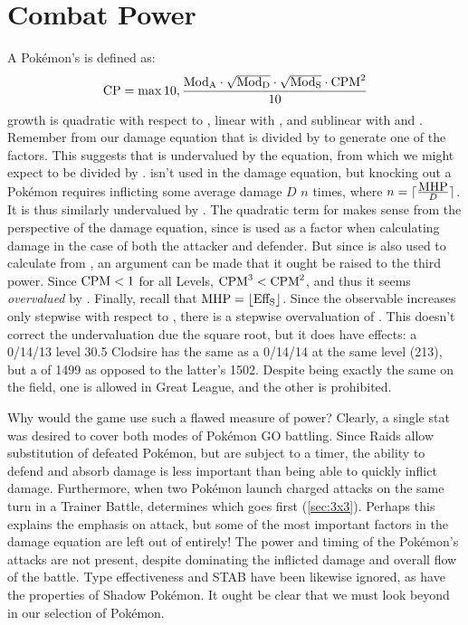 \section{Combat Power\label{sec:cp}}
A Pokémon's \CP{} is defined as:
\[ \mbox{$\mathrm{CP}$} = \max{10, \frac{\mbox{$\mathrm{Mod_{A}}$} \cdot \sqrt{\mbox{$\mathrm{Mod_{D}}$}} \cdot \sqrt{\mbox{$\mathrm{Mod_{S}}$}} \cdot \mbox{$\mathrm{CPM}$}^2}{10}} \]
\CP{} growth is quadratic with respect to \CPM, linear with , and
  sublinear with  and .
Remember from our damage equation that  is divided by 
 to generate one of the factors.
This suggests that  is undervalued by the \CP{} equation, from which
 we might expect  to be divided by .
\MHP{} isn't used in the damage equation, but knocking out a Pokémon
 requires inflicting some average damage $D$ $n$ times,
 where $n = \lceil\frac{\mbox{$\mathrm{MHP}$}}{D}\rceil$.
It is thus similarly undervalued by \CP\@.
The quadratic term for \CPM{} makes sense from the perspective of the damage
 equation, since \CPM{} is used as a factor when calculating damage in the
 case of both the attacker and defender.
But since \CPM{} is also used to calculate \MHP{} from , an argument
 can be made that it ought be raised to the third power.
Since $\mbox{$\mathrm{CPM}$} < 1$ for all Levels, $\mbox{$\mathrm{CPM}$}^3 < \mbox{$\mathrm{CPM}$}^2$, and thus it seems \textit{overvalued} by \CP\@.
Finally, recall that $\mbox{$\mathrm{MHP}$} = \lfloor \mbox{$\mathrm{Eff_{S}}$} \rfloor$.
Since the observable \MHP{} increases only stepwise with respect to ,
  there is a stepwise overvaluation of .
This doesn't correct the undervaluation due the square root, but it does
  have effects: a 0/14/13 level 30.5 Clodsire has the same \MHP{}
  as a 0/14/14 at the same level (213), but a \CP{} of 1499 as
  opposed to the latter's 1502.
Despite being exactly the same on the field, one is allowed in Great League,
  and the other is prohibited.

Why would the game use such a flawed measure of power?
Clearly, a single stat was desired to cover both modes of Pokémon GO battling.
Since Raids allow substitution of defeated Pokémon, but are subject to a timer,
  the ability to defend and absorb damage is less important than being able to
  quickly inflict damage.
Furthermore, when two Pokémon launch charged attacks on the same turn in a Trainer
  Battle,  determines which goes first (\autoref{sec:3x3}).
Perhaps this explains the emphasis on attack, but some of the most important
  factors in the damage equation are left out of \CP{} entirely!
The power and timing of the Pokémon's attacks are not present, despite
  dominating the inflicted damage and overall flow of the battle.
Type effectiveness and STAB have been likewise ignored, as have the
  properties of Shadow Pokémon.
It ought be clear that we must look beyond \CP{} in our selection of Pokémon.

